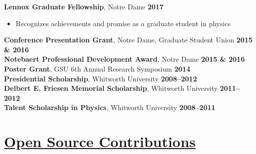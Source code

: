 \documentclass[margin]{res}
\begin{document}
\begin{resume}
{\bf Lennox Graduate Fellowship}, Notre Dame \hfill {\bf 2017}
    \begin{itemize}  \itemsep -2pt %
     \item[] Recognizes achievements and promise as a graduate student in physics
    \end{itemize} \vspace{-12pt}
{\bf Conference Presentation Grant}, Notre Dame, Graduate Student Union  \hfill {\bf 2015 \& 2016}\\
{\bf Notebaert Professional Development Award}, Notre Dame \hfill {\bf 2015 \& 2016}\\
{\bf Poster Grant}, GSU 6th Annual Research Symposium \hfill {\bf 2014}\\
{\bf Presidential Scholarship}, Whitworth University \hfill {\bf2008--2012}\\
{\bf Delbert E. Friesen Memorial Scholarship}, Whitworth University \hfill {\bf2011--2012}\\
{\bf Talent Scholarship in Physics}, Whitworth University \hfill {\bf2008--2011}







\section{\href{https://github.com/benjaminrose}{Open Source Contributions}}


\end{resume}
\end{document}
